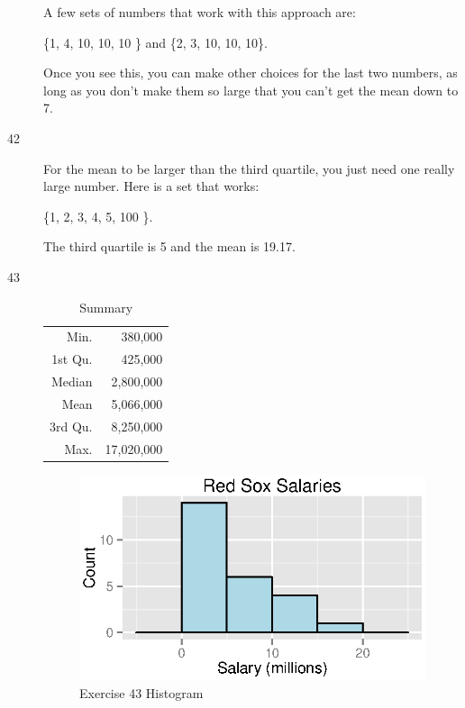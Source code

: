 \documentclass{exam}
\begin{document}
\begin{description}
        A few sets of numbers that work with this approach are: 
        
        \{1, 4, 10, 10, 10 \} and \{2, 3, 10, 10, 10\}.

        Once you see this, you can make other choices for the last two numbers,
        as long as you don't make them so large that you can't get the mean
        down to 7.  

      \item[42]
        For the mean to be larger than the third quartile, you just need one
        really large number.  Here is a set that works: 
        
        \{1, 2, 3, 4, 5, 100 \}.  
        
        The third quartile is 5 and the mean is 19.17.

      \item[43]
        \begin{table}[ht]
          \centering
          \begin{tabular}{rr}
            \toprule
            Min.    & 380,000 \\
            1st Qu. & 425,000 \\
            Median  & 2,800,000 \\
            Mean    & 5,066,000 \\
            3rd Qu. & 8,250,000 \\
            Max.    & 17,020,000 \\
            \bottomrule
          \end{tabular}
          \caption{Summary}
        \end{table}

        \begin{figure}[H]
          \centering
          \includegraphics{figures/ex43.eps}
          \caption{Exercise 43 Histogram}
        \end{figure}


\end{description}
\end{document}
